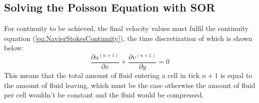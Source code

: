 \subsection{Solving the Poisson Equation with SOR}
\label{sec:SimulationPoisson}
For continuity to be achieved, the final velocity values must fulfil the continuity equation (\cref{eq:NavierStokesContinuity}), the time discretization of which is shown below:
\begin{equation}
    \frac{\partial{u^{(n+1)}}}{\partial{x}} + \frac{\partial{v^{(n+1)}}}{\partial{y}} = 0
\end{equation}
This means that the total amount of fluid entering a cell in tick $n+1$ is equal to the amount of fluid leaving, which must be the case otherwise the amount of fluid per cell wouldn't be constant and the fluid would be compressed.


